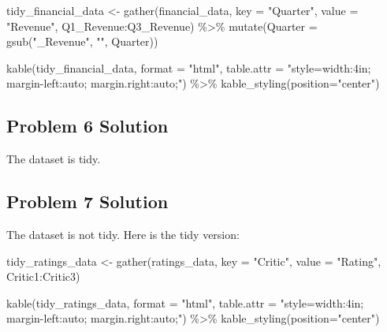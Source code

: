\documentclass[
  letterpaper,
  DIV=11,
  numbers=noendperiod]{scrreprt}
\newenvironment{Shaded}{\begin{snugshade}}{\end{snugshade}}
\newcommand{\AttributeTok}[1]{\textcolor[rgb]{0.40,0.45,0.13}{#1}}
\newcommand{\FunctionTok}[1]{\textcolor[rgb]{0.28,0.35,0.67}{#1}}
\newcommand{\NormalTok}[1]{\textcolor[rgb]{0.00,0.23,0.31}{#1}}
\newcommand{\OtherTok}[1]{\textcolor[rgb]{0.00,0.23,0.31}{#1}}
\newcommand{\SpecialCharTok}[1]{\textcolor[rgb]{0.37,0.37,0.37}{#1}}
\newcommand{\StringTok}[1]{\textcolor[rgb]{0.13,0.47,0.30}{#1}}
\begin{document}
\begin{Shaded}
\begin{Highlighting}[]
\NormalTok{tidy\_financial\_data }\OtherTok{\textless{}{-}} \FunctionTok{gather}\NormalTok{(financial\_data, }\AttributeTok{key =} \StringTok{"Quarter"}\NormalTok{, }\AttributeTok{value =} \StringTok{"Revenue"}\NormalTok{, Q1\_Revenue}\SpecialCharTok{:}\NormalTok{Q3\_Revenue) }\SpecialCharTok{\%\textgreater{}\%}
  \FunctionTok{mutate}\NormalTok{(}\AttributeTok{Quarter =} \FunctionTok{gsub}\NormalTok{(}\StringTok{"\_Revenue"}\NormalTok{, }\StringTok{""}\NormalTok{, Quarter))}

\FunctionTok{kable}\NormalTok{(tidy\_financial\_data, }\AttributeTok{format =} \StringTok{"html"}\NormalTok{, }\AttributeTok{table.attr =} \StringTok{"style=\textquotesingle{}width:4in; margin{-}left:auto; margin.right:auto;\textquotesingle{}"}\NormalTok{)  }\SpecialCharTok{\%\textgreater{}\%}
  \FunctionTok{kable\_styling}\NormalTok{(}\AttributeTok{position=}\StringTok{"center"}\NormalTok{)}
\end{Highlighting}
\end{Shaded}

\subsection*{Problem 6 Solution}\label{problem-6-solution}

The dataset is tidy.

\subsection*{Problem 7 Solution}\label{problem-7-solution}

The dataset is not tidy. Here is the tidy version:

\begin{Shaded}
\begin{Highlighting}[]
\NormalTok{tidy\_ratings\_data }\OtherTok{\textless{}{-}} \FunctionTok{gather}\NormalTok{(ratings\_data, }\AttributeTok{key =} \StringTok{"Critic"}\NormalTok{, }\AttributeTok{value =} \StringTok{"Rating"}\NormalTok{, Critic1}\SpecialCharTok{:}\NormalTok{Critic3)}

\FunctionTok{kable}\NormalTok{(tidy\_ratings\_data, }\AttributeTok{format =} \StringTok{"html"}\NormalTok{, }\AttributeTok{table.attr =} \StringTok{"style=\textquotesingle{}width:4in; margin{-}left:auto; margin.right:auto;\textquotesingle{}"}\NormalTok{)  }\SpecialCharTok{\%\textgreater{}\%}
  \FunctionTok{kable\_styling}\NormalTok{(}\AttributeTok{position=}\StringTok{"center"}\NormalTok{)}
\end{Highlighting}
\end{Shaded}
\end{document}
